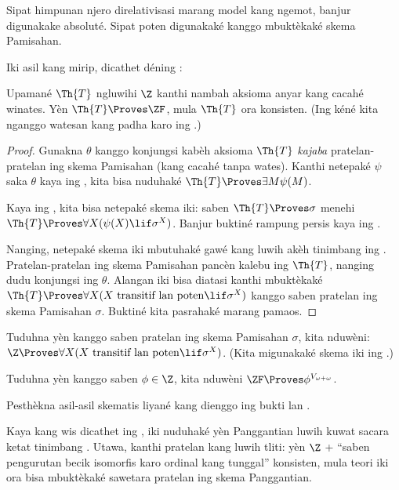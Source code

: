 \documentclass[../../../include/open-logic-section]{subfiles}
\begin{document}
Sipat himpunan njero direlativisasi marang model kang ngemot, banjur digunakake absoluté. Sipat poten digunakaké kanggo mbuktèkaké skema Pamisahan.

Iki asil kang mirip, dicathet déning \citet[223]{Potter2004}:

\begin{prop}
	Upamané $\Th{T}$ ngluwihi $\Z$ kanthi nambah aksioma anyar kang cacahé winates. Yèn $\Th{T} \Proves \ZF$, mula $\Th{T}$ ora konsisten. (Ing kéné kita nganggo watesan kang padha karo ing .)
\end{prop}
\begin{proof}
	Gunakna $\theta$ kanggo konjungsi kabèh aksioma $\Th{T}$ \emph{kajaba} pratelan-pratelan ing skema Pamisahan (kang cacahé tanpa wates). Kanthi netepaké $\psi$ saka $\theta$ kaya ing , kita bisa nuduhaké $\Th{T} \Proves \exists M \psi(M)$. 
	
	Kaya ing , kita bisa netepaké skema iki: saben $\Th{T} \Proves \sigma$ menehi $\Th{T} \Proves \forall X(\psi(X) \lif \sigma^X)$. Banjur buktiné rampung persis kaya ing .
	
	Nanging, netepaké skema iki mbutuhaké gawé kang luwih akèh tinimbang ing . Pratelan-pratelan ing skema Pamisahan pancèn kalebu ing $\Th{T}$, nanging dudu konjungsi ing $\theta$. Alangan iki bisa diatasi kanthi mbuktèkaké $\Th{T} \Proves \forall X(X\text{ transitif lan poten} \lif \sigma^X)$ kanggo saben pratelan ing skema Pamisahan $\sigma$. Buktiné kita pasrahaké marang pamaos. 
\end{proof}
\begin{prob}
	Tuduhna yèn kanggo saben pratelan ing skema Pamisahan $\sigma$, kita nduwèni: $\Z \Proves \forall X(X\text{ transitif lan poten} \lif \sigma^X)$. (Kita migunakaké skema iki ing .)
\end{prob}
\begin{prob}
	Tuduhna yèn kanggo saben $\phi \in \Z$, kita nduwèni $\ZF \Proves \phi^{V_{\omega+\omega}}$.
\end{prob}
\begin{prob}
	Pesthèkna asil-asil skematis liyané kang dienggo ing bukti  lan .
\end{prob}

Kaya kang wis dicathet ing , iki nuduhaké yèn Panggantian luwih kuwat sacara ketat tinimbang
. Utawa, kanthi pratelan kang luwih tliti: yèn $\Z$ + “saben pengurutan becik isomorfis karo ordinal kang tunggal” konsisten, mula teori iki ora bisa mbuktèkaké sawetara pratelan ing skema Panggantian.
\end{document}

